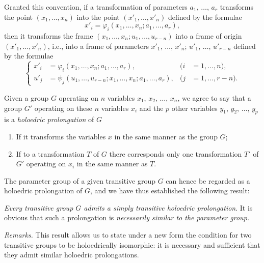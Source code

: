 \documentclass[leqno,11pt]{book}
\makeatletter
\numberwithin{equation}{chapter}
\theoremstyle{shape1}
\theoremstyle{shapesmall}
\let\old@phi\phi
\let\old@varphi\varphi
\let\phi\old@varphi
\let\varphi\old@phi
\newcommand{\somespace}{\vspace{9pt}}
\makeatother
\begin{document}
Granted this convention, if a transformation of parameters $a_{1}$, $\dots$, $a_{r}$ transforms the point $(x_{1},\dots, x_{n})$ into the point $(x'_{1},\dots, x'_{n})$ defined by the formulae
\begin{equation}
  \label{eq:7.1}
  x'_{i}=\phi_{i}(x_{1},\dots,x_{n};a_{1},\dots,a_{r}),
\end{equation}
then it transforms the frame $(x_{1},\dots,x_{n};u_{1},\dots,u_{r-n})$ into a frame of origin $(x'_{1},\dots,x'_{n})$, i.e., into a frame of parameters $x'_{1}$, $\dots$, $x'_{n}$; $u'_{1}$, $\dots$, $u'_{r-n}$ defined by the formulae
\begin{equation}
  \label{eq:7.2}
  \left\{
    \begin{aligned}
      x'_{i}&=\phi_{i}(x_{1},\dots,x_{n};a_{1},\dots,a_{r}),&(i&=1,\dots,n),\\
      u'_{j}&=\psi_{j}(u_{1},\dots,u_{r-n};x_{1},\dots,x_{n};a_{1},\dots,a_{r}),&(j&=1,\dots,r-n).      
    \end{aligned}
  \right.
\end{equation}

Given a group $G$ operating on $n$ variables $x_{1}$, $x_{2}$, $\dots$, $x_{n}$, we agree to say that a group $G'$ operating on these $n$ variables $x_{i}$ and the $p$ other variables $y_{1}$, $y_{2}$, $\dots$, $y_{p}$ is a \emph{holoedric prolongation} of $G$
\begin{enumerate}
\item If it transforms the variables $x$ in the same manner as the group $G$;
\item If to a transformation $T$ of $G$ there corresponds only one transformation $T'$ of $G'$ operating on $x_{i}$ in the same manner as $T$.
\end{enumerate}

The parameter group of a given transitive group $G$ can hence be regarded as a holoedric prolongation of $G$, and we have thus established the following result:

\somespace

\emph{Every transitive group $G$ admits a simply transitive holoedric prolongation}. It is obvious that such a prolongation is \emph{necessarily similar to the parameter group.}

\somespace

\emph{Remarks.} This result allows us to state under a new form the condition for two transitive groups to be holoedrically isomorphic: it is necessary and sufficient that they admit similar holoedric prolongations.
\end{document}
